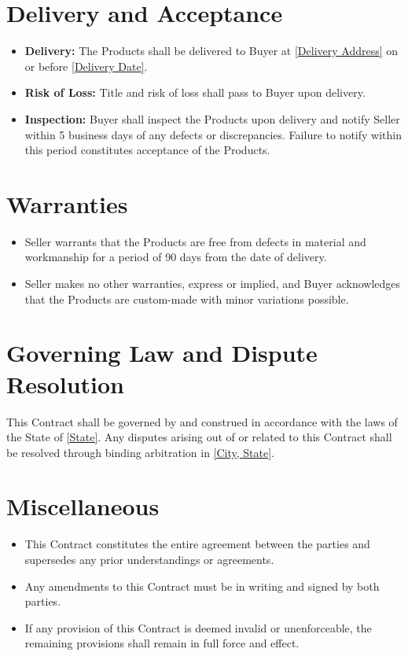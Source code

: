 \documentclass[12pt]{article}
\begin{document}
\section{Delivery and Acceptance}
\begin{itemize}
    \item \textbf{Delivery:} The Products shall be delivered to Buyer at \underline{[Delivery Address]} on or before \underline{[Delivery Date]}.
    \item \textbf{Risk of Loss:} Title and risk of loss shall pass to Buyer upon delivery.
    \item \textbf{Inspection:} Buyer shall inspect the Products upon delivery and notify Seller within 5 business days of any defects or discrepancies. Failure to notify within this period constitutes acceptance of the Products.
\end{itemize}

\section{Warranties}
\begin{itemize}
    \item Seller warrants that the Products are free from defects in material and workmanship for a period of 90 days from the date of delivery.
    \item Seller makes no other warranties, express or implied, and Buyer acknowledges that the Products are custom-made with minor variations possible.
\end{itemize}

\section{Governing Law and Dispute Resolution}
This Contract shall be governed by and construed in accordance with the laws of the State of \underline{[State]}. Any disputes arising out of or related to this Contract shall be resolved through binding arbitration in \underline{[City, State]}.

\section{Miscellaneous}
\begin{itemize}
    \item This Contract constitutes the entire agreement between the parties and supersedes any prior understandings or agreements.
    \item Any amendments to this Contract must be in writing and signed by both parties.
    \item If any provision of this Contract is deemed invalid or unenforceable, the remaining provisions shall remain in full force and effect.
\end{itemize}
\end{document}
